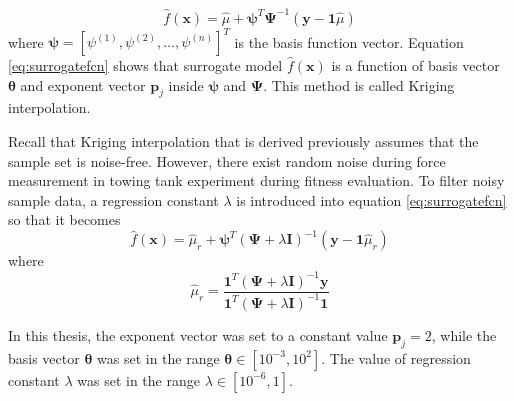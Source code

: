 \begin{equation}
    \hat{f}(\mathbf{x}) = \hat{\mu} + \boldsymbol{\psi}^{T}\boldsymbol{\Psi}^{-1}\left(\mathbf{y} - \mathbf{1}\hat{\mu}\right)
    \label{eq:surrogatefcn}
\end{equation}
where $\boldsymbol{\psi} = [\psi^{(1)}, \psi^{(2)}, \dots, \psi^{(n)}]^{T}$ is the basis function vector. Equation \ref{eq:surrogatefcn} shows that surrogate model $\hat{f}(\mathbf{x})$ is a function of basis vector $\boldsymbol{\theta}$ and exponent vector $\mathbf{p}_{j}$ inside $\boldsymbol{\psi}$ and $\boldsymbol{\Psi}$. This method is called Kriging interpolation.\par
Recall that Kriging interpolation that is derived previously assumes that the sample set is noise-free. However, there exist random noise during force measurement in towing tank experiment during fitness evaluation. To filter noisy sample data, a regression constant $\lambda$ is introduced into equation \ref{eq:surrogatefcn} so that it becomes
\begin{equation}
    \hat{f}(\mathbf{x}) = \hat{\mu}_{r} + \boldsymbol{\psi}^{T}\left(\boldsymbol{\Psi} + \lambda\mathbf{I}\right)^{-1}\left(\mathbf{y} - \mathbf{1}\hat{\mu}_{r}\right)
    \label{eq:surrogatefcnmod}
\end{equation}
where
\begin{equation}
    \hat{\mu}_{r} = \frac{\mathbf{1}^{T}(\boldsymbol{\Psi} + \lambda\mathbf{I})^{-1}\mathbf{y}}{\mathbf{1}^{T}(\boldsymbol{\Psi} + \lambda\mathbf{I})^{-1}\mathbf{1}}
    \label{eq:mur}
\end{equation}
\par
In this thesis, the exponent vector was set to a constant value $\mathbf{p}_{j} = 2$, while the basis vector $\boldsymbol{\theta}$ was set in the range $\boldsymbol{\theta}\in[10^{-3},10^{2}]$. The value of regression constant $\lambda$ was set in the range $\lambda\in[10^{-6},1]$.\par